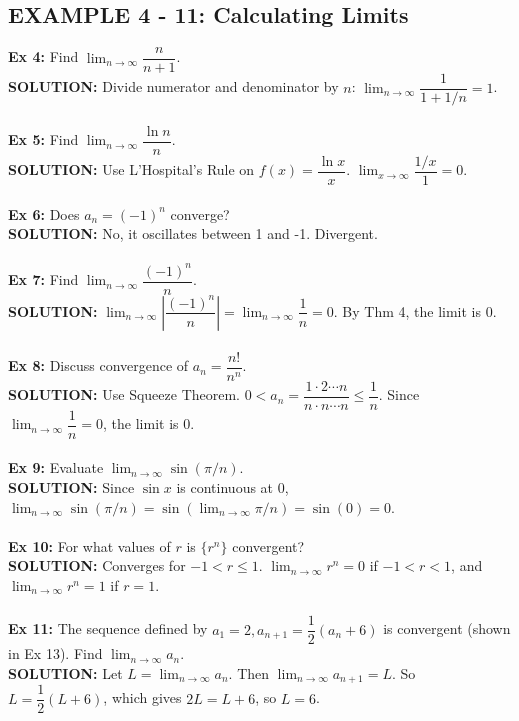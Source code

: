 \documentclass{article}
\theoremstyle{mystyle}
\begin{document}
\subsection*{EXAMPLE 4 - 11: Calculating Limits}
\textbf{Ex 4:} Find \(\lim_{n\to\infty} \dfrac{n}{n+1}\).\\
 \textbf{SOLUTION:} Divide numerator and denominator by \(n\): \(\lim_{n\to\infty} \dfrac{1}{1+1/n} = 1\).\\\\
\textbf{Ex 5:} Find \(\lim_{n\to\infty} \dfrac{\ln n}{n}\).\\
 \textbf{SOLUTION:} Use L'Hospital's Rule on \(f(x) = \dfrac{\ln x}{x}\). \(\lim_{x\to\infty} \dfrac{1/x}{1} = 0\).\\\\
\textbf{Ex 6:} Does \(a_n = (-1)^n\) converge?\\
 \textbf{SOLUTION:} No, it oscillates between 1 and -1. Divergent.\\\\
\textbf{Ex 7:} Find \(\lim_{n\to\infty} \dfrac{(-1)^n}{n}\).\\
 \textbf{SOLUTION:} \(\lim_{n\to\infty} |\dfrac{(-1)^n}{n}| = \lim_{n\to\infty} \dfrac{1}{n} = 0\). By Thm 4, the limit is 0.\\\\
\textbf{Ex 8:} Discuss convergence of \(a_n = \dfrac{n!}{n^n}\).\\
 \textbf{SOLUTION:} Use Squeeze Theorem. \(0 < a_n = \dfrac{1 \cdot 2 \cdots n}{n \cdot n \cdots n} \le \dfrac{1}{n}\). Since \(\lim_{n\to\infty} \dfrac{1}{n} = 0\), the limit is 0.\\\\
\textbf{Ex 9:} Evaluate \(\lim_{n\to\infty} \sin(\pi/n)\).\\
 \textbf{SOLUTION:} Since \(\sin x\) is continuous at 0, \(\lim_{n\to\infty} \sin(\pi/n) = \sin(\lim_{n\to\infty} \pi/n) = \sin(0) = 0\).\\\\
\textbf{Ex 10:} For what values of \(r\) is \(\{r^n\}\) convergent?\\
 \textbf{SOLUTION:} Converges for \(-1 < r \le 1\). \(\lim_{n\to\infty} r^n = 0\) if \(-1 < r < 1\), and \(\lim_{n\to\infty} r^n = 1\) if \(r=1\).\\\\
\textbf{Ex 11:} The sequence defined by \(a_1=2, a_{n+1}=\dfrac{1}{2}(a_n+6)\) is convergent (shown in Ex 13). Find \(\lim_{n\to\infty} a_n\).\\
 \textbf{SOLUTION:} Let \(L = \lim_{n\to\infty} a_n\). Then \(\lim_{n\to\infty} a_{n+1} = L\). So \(L = \dfrac{1}{2}(L+6)\), which gives \(2L=L+6\), so \(L=6\).\\
\end{document}
